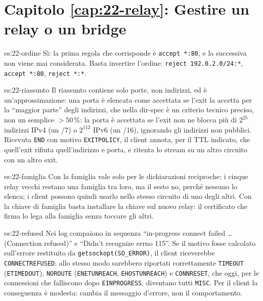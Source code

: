 \section*{Capitolo \ref{cap:22-relay}: Gestire un relay o un bridge}

\begin{soluzione}{es:22-ordine}
Sì: la prima regola che corrisponde è \texttt{accept *:80}, e la successiva non viene mai considerata. Basta invertire l'ordine: \texttt{reject 192.0.2.0/24:*}, \texttt{accept *:80}, \texttt{reject *:*}.
\end{soluzione}

\begin{soluzione}{es:22-riassunto}
Il riassunto contiene solo porte, non indirizzi, ed è un'approssimazione: una porta è elencata come accettata se l'exit la accetta per la \enquote{maggior parte} degli indirizzi, che nella dir-spec è un criterio tecnico preciso, non un semplice ${>}50\,\%$: la porta è accettata se l'exit non ne blocca più di $2^{25}$ indirizzi IPv4 (un /7) o $2^{112}$ IPv6 (un /16), ignorando gli indirizzi non pubblici. Ricevuta \texttt{END} con motivo \texttt{EXITPOLICY}, il client annota, per il TTL indicato, che quell'exit rifiuta quell'indirizzo e porta, e ritenta lo stream su un altro circuito con un altro exit.
\end{soluzione}

\begin{soluzione}{es:22-famiglia}
Con  la famiglia vale solo per le dichiarazioni reciproche: i cinque relay vecchi restano una famiglia tra loro, ma il sesto no, perché nessuno lo elenca; i client possono quindi usarlo nello stesso circuito di uno degli altri. Con la chiave di famiglia basta installare la chiave sul nuovo relay: il certificato che firma lo lega alla famiglia senza toccare gli altri.
\end{soluzione}

\begin{soluzione}{es:22-refused}
Nei log compaiono in sequenza \enquote{in-progress connect failed \ldots (Connection refused)} e \enquote{Didn't recognize errno 115}. Se il motivo fosse calcolato sull'errore restituito da \texttt{getsockopt(SO\_ERROR)}, il client riceverebbe \texttt{CONNECTREFUSED}; allo stesso modo sarebbero riportati correttamente \texttt{TIMEOUT} (\texttt{ETIMEDOUT}), \texttt{NOROUTE} (\texttt{ENETUNREACH}, \texttt{EHOSTUNREACH}) e \texttt{CONNRESET}, che oggi, per le connessioni che falliscono dopo \texttt{EINPROGRESS}, diventano tutti \texttt{MISC}. Per il client la conseguenza è modesta: cambia il messaggio d'errore, non il comportamento.
\end{soluzione}

